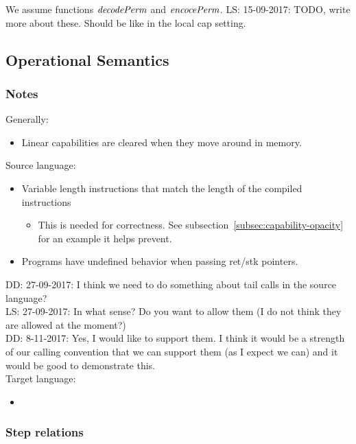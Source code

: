 \documentclass[a3paper]{article}
\newcommand\lau[1]{{\color{purple} \sf \footnotesize {LS: #1}}\\}
\newcommand\dominique[1]{{\color{purple} \sf \footnotesize {DD: #1}}\\}
\newcommand{\plainfun}[2]{
  \ifthenelse{\equal{#2}{}}
  {\mathit{#1}}
  {\mathit{#1}(#2)}
}
\newcommand{\decPerm}[1]{\plainfun{decodePerm}{#1}}
\newcommand{\encPerm}[1]{\plainfun{encocePerm}{#1}}
\begin{document}
We assume functions $\decPerm{}$ and $\encPerm{}$.
\lau{15-09-2017: TODO, write more about these. Should be like in the local cap setting.}

\subsection{Operational Semantics}
\subsubsection{Notes}
Generally:
\begin{itemize}
\item Linear capabilities are cleared when they move around in memory.
\end{itemize}

Source language:
\begin{itemize}
\item Variable length instructions that match the length of the compiled instructions
  \begin{itemize}
  \item This is needed for correctness. See subsection~\ref{subsec:capability-opacity} for an example it helps prevent.
  \end{itemize}
\item Programs have undefined behavior when passing ret/stk pointers.
\end{itemize}

\dominique{27-09-2017: I think we need to do something about tail calls in the source language?}
\lau{27-09-2017: In what sense? Do you want to allow them (I do not think they are allowed at the moment?)}
\dominique{8-11-2017: Yes, I would like to support them.  I think it would be a strength of our calling convention that we can support them (as I expect we can) and it would be good to demonstrate this.}

Target language:
\begin{itemize}
\item 
\end{itemize}

\subsubsection{Step relations}
\end{document}
